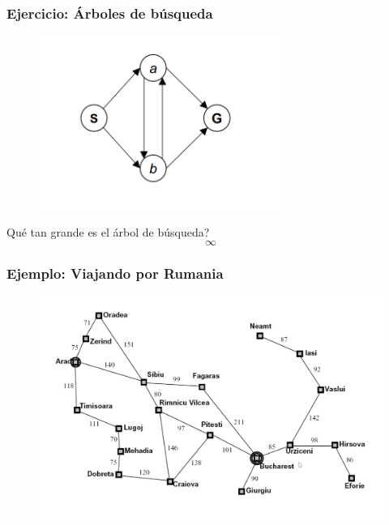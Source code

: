 \documentclass[10pt]{beamer}
\begin{document}
\begin{frame}
  \frametitle{Ejercicio: Árboles de búsqueda}
  \begin{figure}[!h] 
    \centering
    \includegraphics[width=0.7\textwidth]{img/estado2}
  \end{figure}
  Qué tan grande es el árbol de búsqueda?
  \pause
  $$ \infty $$
\end{frame}

\begin{frame}
  \frametitle{Ejemplo: Viajando por Rumania}

  \begin{figure}[!h] 
    \centering
    \includegraphics[width=\textwidth]{img/rumania}
  \end{figure} 
  
\end{frame}
\end{document}
